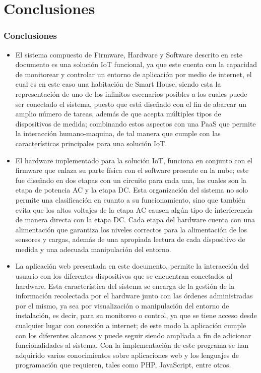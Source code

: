 \section{Conclusiones}
\frametitle{Conclusiones}

\begin{itemize}
	\item El sistema compuesto de Firmware, Hardware y Software descrito en este documento es una solución IoT funcional, ya que este cuenta con la capacidad de monitorear y controlar un entorno de aplicación por medio de internet, el cual es en este caso una habitación de Smart House, siendo esta la representación de uno de los infinitos escenarios posibles a los cuales puede ser conectado el sistema, puesto que está diseñado con el fin de abarcar un amplio número de tareas, además de que acepta múltiples tipos de dispositivos de medida; combinando estos aspectos con una PaaS que permite la interacción humano-maquina, de tal manera que cumple con las características principales para una solución IoT.\\
	
	\item El hardware implementado para la solución IoT, funciona en conjunto con el firmware que enlaza su parte física con el software presente en la nube; este fue diseñado en dos etapas con un circuito para cada una, las cuales son la etapa de potencia AC y la etapa DC. Esta organización del sistema no solo permite una clasificación en cuanto a su funcionamiento, sino que también evita que los altos voltajes de la etapa AC causen algún tipo de interferencia de manera directa con la etapa DC. Cada etapa del hardware cuenta con una alimentación que garantiza los niveles correctos para la alimentación de los sensores y cargas, además de una apropiada lectura de cada dispositivo de medida y una adecuada manipulación del entorno.\\
	
	\item La aplicación web presentada en este documento, permite la interacción del usuario con los diferentes dispositivos que se encuentran conectados al hardware. Esta característica del sistema se encarga de la gestión de la información recolectada por el hardware junto con las órdenes administradas por el mismo, ya sea por visualización o manipulación del entorno de instalación, es decir, para su monitoreo o control, ya que se tiene acceso desde cualquier lugar con conexión a internet; de este modo la aplicación cumple con los diferentes alcances y puede seguir siendo ampliada a fin de adicionar funcionalidades al sistema. Con la implementación de este programa se han adquirido varios conocimientos sobre aplicaciones web y los lenguajes de programación que requieren, tales como PHP, JavaScript, entre otros.\\
	

\end{itemize}
